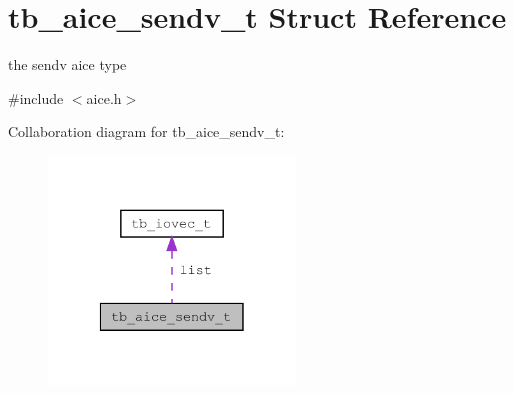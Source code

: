 \hypertarget{structtb__aice__sendv__t}{\section{tb\-\_\-aice\-\_\-sendv\-\_\-t Struct Reference}
\label{structtb__aice__sendv__t}
}


the sendv aice type  




{\ttfamily \#include $<$aice.\-h$>$}



Collaboration diagram for tb\-\_\-aice\-\_\-sendv\-\_\-t\-:\nopagebreak
\begin{figure}[H]
\begin{center}
\leavevmode
\includegraphics[width=186pt]{d7/d06/structtb__aice__sendv__t__coll__graph}
\end{center}
\end{figure}
